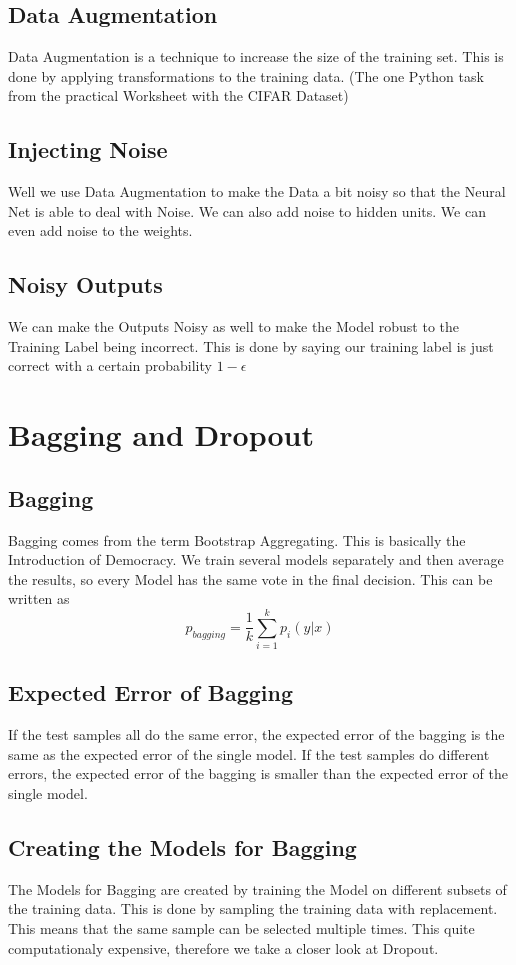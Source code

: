 \documentclass[a4paper]{article}
\begin{document}
\subsection{Data Augmentation}
Data Augmentation is a technique to increase the size of the training set. This is done by applying transformations to the training data. (The one Python task from the practical Worksheet with the CIFAR Dataset)
\subsection{Injecting Noise}
Well we use Data Augmentation to make the Data a bit noisy so that the Neural Net is able to deal with Noise. We can also add noise to hidden units. 
We can even add noise to the weights. 
\subsection{Noisy Outputs}
We can make the Outputs Noisy as well to make the Model robust to the Training Label being incorrect. This is done by saying our training label is just correct with a certain probability $1 - \epsilon$ 

\section{Bagging and Dropout}
\subsection{Bagging}
Bagging comes from the term Bootstrap Aggregating. This is basically the Introduction of Democracy. We train several models separately and then average the results, so every Model has the same vote in the final decision. This can be written as $$ p_{bagging} = \frac{1}{k} \sum_{i=1}^{k} p_{i}(y|x)$$ 

\subsection{Expected Error of Bagging}
If the test samples all do the same error, the expected error of the bagging is the same as the expected error of the single model. If the test samples do different errors, the expected error of the bagging is smaller than the expected error of the single model. 

\subsection{Creating the Models for Bagging}
The Models for Bagging are created by training the Model on different subsets of the training data. This is done by sampling the training data with replacement. This means that the same sample can be selected multiple times. This quite computationaly expensive, therefore we take a closer look at Dropout.
\end{document}
